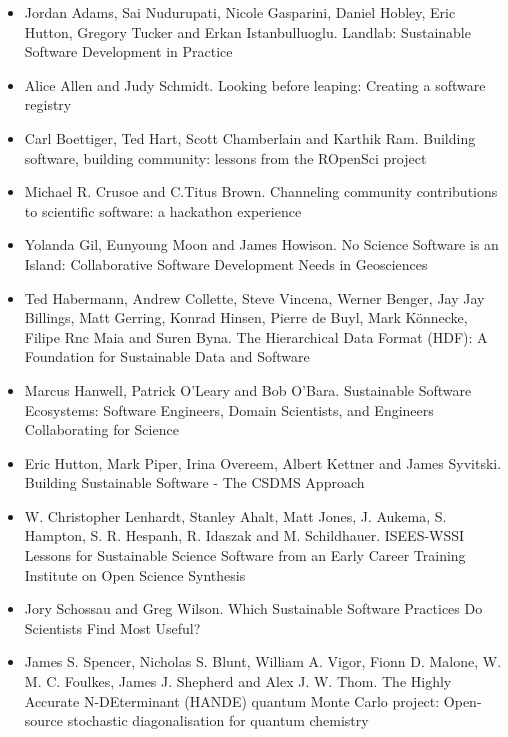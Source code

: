 \documentclass[11pt, oneside]{amsart}
\begin{document}
\begin{itemize}
\item Jordan Adams, Sai Nudurupati, Nicole Gasparini, Daniel Hobley, Eric Hutton, Gregory Tucker and Erkan Istanbulluoglu. Landlab: Sustainable Software Development in Practice ~\cite{wssspe2_adams}
\item Alice Allen and Judy Schmidt. Looking before leaping: Creating a software registry~\cite{wssspe2_allen}
\item Carl Boettiger, Ted Hart, Scott Chamberlain and Karthik Ram. Building software, building community: lessons from the {ROpenSci} project~\cite{wssspe2_boettiger}
\item Michael R. Crusoe and C.Titus Brown. Channeling community contributions to scientific software: a hackathon experience~\cite{wssspe2_crusoe}
\item Yolanda Gil,  Eunyoung Moon and James Howison. No Science Software is an Island: Collaborative Software Development Needs in Geosciences~\cite{wssspe2_gil}
\item Ted Habermann, Andrew Collette, Steve Vincena, Werner Benger, Jay Jay Billings, Matt Gerring, Konrad Hinsen, Pierre de Buyl, Mark K\"{o}nnecke, Filipe Rnc Maia and Suren Byna. The Hierarchical Data Format ({HDF}): A Foundation for Sustainable Data and Software~\cite{wssspe2_habermann}
\item Marcus Hanwell, Patrick O'Leary and Bob O'Bara. Sustainable Software Ecosystems: Software Engineers, Domain Scientists, and Engineers Collaborating for Science~\cite{wssspe2_hanwell}
\item Eric Hutton, Mark Piper, Irina Overeem, Albert Kettner and James Syvitski. Building Sustainable Software - The {CSDMS} Approach~\cite{wssspe2_hutton}
\item W. Christopher Lenhardt, Stanley Ahalt, Matt Jones, J. Aukema, S. Hampton, S. R. Hespanh, R. Idaszak and M. Schildhauer. {ISEES-WSSI} Lessons for Sustainable Science Software from an Early Career Training Institute on Open Science Synthesis~\cite{wssspe2_lenhardt}
\item Jory Schossau and Greg Wilson. Which Sustainable Software Practices Do Scientists Find Most Useful?~\cite{wssspe2_schossau}
\item James S. Spencer, Nicholas S. Blunt, William A. Vigor, Fionn D. Malone, W. M. C. Foulkes, James J. Shepherd and Alex J. W. Thom. The {H}ighly {A}ccurate {N-DE}terminant ({HANDE}) quantum {Monte Carlo} project: Open-source stochastic diagonalisation for quantum chemistry~\cite{wssspe2_spencer}
\end{itemize}
\end{document}
